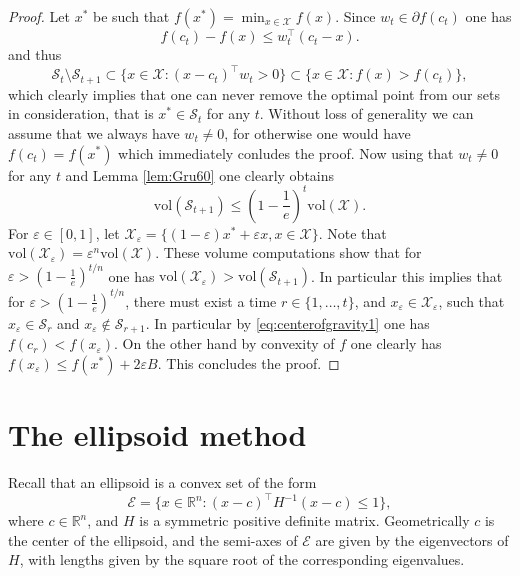 \documentclass[openany]{now}
\newcommand{\R}{\mathbb{R}}
\newcommand{\cX}{\mathcal{X}}
\newcommand{\cS}{\mathcal{S}}
\newcommand{\cE}{\mathcal{E}}
\renewcommand{\epsilon}{\varepsilon}
\begin{document}
\begin{proof}
Let $x^*$ be such that $f(x^*) = \min_{x \in \mathcal{X}} f(x)$. Since $w_t \in \partial f(c_t)$ one has
$$f(c_t) - f(x) \leq w_t^{\top} (c_t - x) .$$
and thus
\begin{equation} \label{eq:centerofgravity1}
\cS_{t} \setminus \cS_{t+1} \subset \{x \in \cX : (x-c_t)^{\top} w_t > 0\} \subset \{x \in \cX : f(x) > f(c_t)\} ,
\end{equation}
which clearly implies that one can never remove the optimal point from our sets in consideration, that is $x^* \in \cS_t$ for any $t$.
Without loss of generality we can assume that we always have $w_t \neq 0$, for otherwise one would have $f(c_t) = f(x^*)$ which immediately conludes the proof. Now using that $w_t \neq 0$ for any $t$ and Lemma \ref{lem:Gru60} one clearly obtains
$$\mathrm{vol}(\cS_{t+1}) \leq \left(1 - \frac1{e} \right)^t \mathrm{vol}(\cX) .$$
For $\epsilon \in [0,1]$, let $\mathcal{X}_{\epsilon} = \{(1-\epsilon) x^* + \epsilon x, x \in \mathcal{X}\}$. Note that $\mathrm{vol}(\mathcal{X}_{\epsilon}) = \epsilon^n \mathrm{vol}(\mathcal{X})$. These volume computations show that for $\epsilon > \left(1 - \frac1{e} \right)^{t/n}$ one has $\mathrm{vol}(\mathcal{X}_{\epsilon}) > \mathrm{vol}(\cS_{t+1})$. In particular this implies that for $\epsilon > \left(1 - \frac1{e} \right)^{t/n}$, there must exist a time $r \in \{1,\hdots, t\}$, and $x_{\epsilon} \in \mathcal{X}_{\epsilon}$, such that $x_{\epsilon} \in \cS_{r}$ and $x_{\epsilon} \not\in \cS_{r+1}$. In particular by \eqref{eq:centerofgravity1} one has $f(c_r) < f(x_{\epsilon})$. On the other hand by convexity of $f$ one clearly has $f(x_{\epsilon}) \leq f(x^*) + 2 \epsilon B$. This concludes the proof.
\end{proof}

\section{The ellipsoid method} \label{sec:ellipsoid}
Recall that an ellipsoid is a convex set of the form
$$\mathcal{E} = \{x \in \R^n : (x - c)^{\top} H^{-1} (x-c) \leq 1 \} ,$$
where $c \in \R^n$, and $H$ is a symmetric positive definite matrix. Geometrically $c$ is the center of the ellipsoid, and the semi-axes of $\cE$ are given by the eigenvectors of $H$, with lengths given by the square root of the corresponding eigenvalues.
\end{document}

